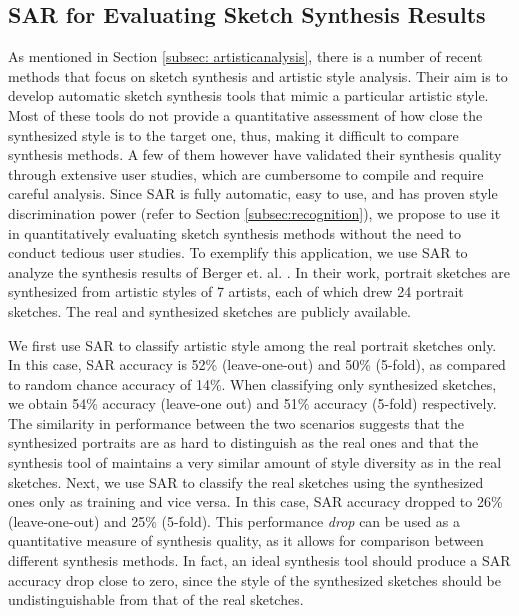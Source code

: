 
\vspace{-2mm}
\subsection{SAR for Evaluating Sketch Synthesis Results}
\vspace{-2mm}
As mentioned in Section \ref{subsec: artisticanalysis}, there is a number of recent methods that focus on sketch synthesis and artistic style analysis. Their aim is to develop automatic sketch synthesis tools that mimic a particular artistic style. Most of these tools do not provide a quantitative assessment of how close the synthesized style is to the target one, thus, making it difficult to compare synthesis methods. A few of them however have validated their synthesis quality through extensive user studies, which are cumbersome to compile and require careful analysis. Since SAR is fully automatic, easy to use, and has proven style discrimination power (refer to Section \ref{subsec:recognition}), we propose to use it in quantitatively evaluating sketch synthesis methods without the need to conduct tedious user studies. To exemplify this application, we use SAR to analyze the synthesis results of Berger et. al. . In their work, portrait sketches are synthesized from artistic styles of 7 artists, each of which drew 24 portrait sketches. The real and synthesized sketches are publicly available.




We first use SAR to classify artistic style among the real portrait sketches only. In this case, SAR accuracy is 52\% (leave-one-out) and 50\% (5-fold), as compared to random chance accuracy of 14\%. When classifying only synthesized sketches, we obtain 54\% accuracy (leave-one out) and 51\% accuracy (5-fold) respectively. The  similarity in performance between the two scenarios suggests that the synthesized portraits are as hard to distinguish as the real ones and that the synthesis tool of \cite{Berger:2013:SAP:2461912.2461964} maintains a very similar amount of style diversity as in the real sketches. Next, we use SAR to classify the real sketches using the synthesized ones only as training and vice versa. In this case, SAR accuracy dropped to 26\% (leave-one-out) and 25\% (5-fold). This performance \emph{drop} can be used as a quantitative measure of synthesis quality, as it allows for comparison between different synthesis methods. In fact, an ideal synthesis tool should produce a SAR accuracy drop close to zero, since the style of the synthesized sketches should be undistinguishable from that of the real sketches.

